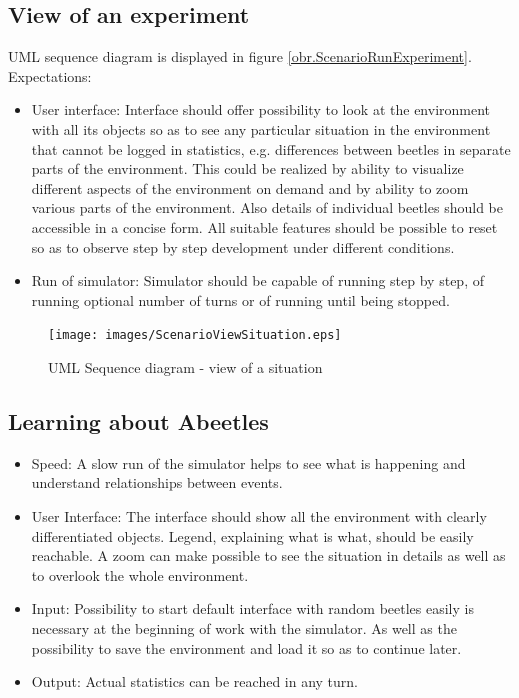 \documentclass[a4paper,12pt]{report}
\begin{document}
\subsection{View of an experiment}
UML sequence diagram is displayed in figure \ref{obr.ScenarioRunExperiment}. Expectations:
\begin{itemize}
\item User interface: Interface should offer possibility to look at the environment with all its objects so as to see any particular situation in the environment that cannot be logged in statistics, e.g. differences between beetles in separate parts of the environment. This could be realized by ability to visualize different aspects of the environment on demand and by ability to zoom various parts of the environment. Also details of individual beetles should be accessible in a concise form. All suitable features should be possible to reset so as to observe step by step development under different conditions. 
\item Run of simulator: Simulator should be capable of running step by step, of running optional number of turns or of running until being stopped.
\end{itemize}

\begin{figure}
\begin{center}
  \texttt{[image: images/ScenarioViewSituation.eps]} 
  \caption{UML Sequence diagram - view of a situation}
  \label{obr.ScenarioViewSituation}
\end{center}
\end{figure}

\subsection{Learning about Abeetles}
\begin{itemize}
\item Speed: A slow run of the simulator helps to see what is happening and understand relationships between events.
\item User Interface: The interface should show all the environment with clearly differentiated objects. Legend, explaining what is what, should be easily reachable. A zoom can make possible to see the situation in details as well as to overlook the whole environment.
\item Input: Possibility to start default interface with random beetles easily is necessary at the beginning of work with the simulator. As well as the possibility to save the environment and load it so as to continue later.
\item Output: Actual statistics can be reached in any turn.  
\end{itemize}
\end{document}
